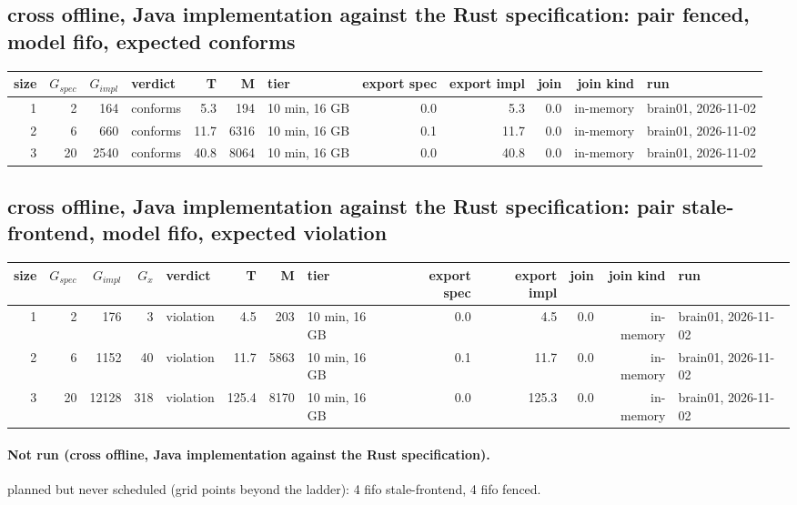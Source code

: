 \documentclass[10pt]{article}
\begin{document}
\subsection*{cross offline, Java implementation against the Rust specification: pair \textsf{fenced}, model fifo, expected conforms}
\begin{longtable}{@{}rrrlrrlrrrrl@{}}
\toprule
size & $G_{\mathit{spec}}$ & $G_{\mathit{impl}}$ & verdict & T & M & tier & export spec & export impl & join & join kind & run \\
\midrule
\endhead
\color{red} 1 & 2 & 164 & conforms & 5.3 & 194 & 10 min, 16 GB & 0.0 & 5.3 & 0.0 & in-memory & brain01, 2026-11-02 \\
\color{red} 2 & 6 & 660 & conforms & 11.7 & 6316 & 10 min, 16 GB & 0.1 & 11.7 & 0.0 & in-memory & brain01, 2026-11-02 \\
\color{red} 3 & 20 & 2540 & conforms & 40.8 & 8064 & 10 min, 16 GB & 0.0 & 40.8 & 0.0 & in-memory & brain01, 2026-11-02 \\
\bottomrule
\end{longtable}
\subsection*{cross offline, Java implementation against the Rust specification: pair \textsf{stale-frontend}, model fifo, expected violation}
\begin{longtable}{@{}rrrrlrrlrrrrl@{}}
\toprule
size & $G_{\mathit{spec}}$ & $G_{\mathit{impl}}$ & $G_x$ & verdict & T & M & tier & export spec & export impl & join & join kind & run \\
\midrule
\endhead
\color{red} 1 & 2 & 176 & 3 & violation & 4.5 & 203 & 10 min, 16 GB & 0.0 & 4.5 & 0.0 & in-memory & brain01, 2026-11-02 \\
\color{red} 2 & 6 & 1152 & 40 & violation & 11.7 & 5863 & 10 min, 16 GB & 0.1 & 11.7 & 0.0 & in-memory & brain01, 2026-11-02 \\
\color{red} 3 & 20 & 12128 & 318 & violation & 125.4 & 8170 & 10 min, 16 GB & 0.0 & 125.3 & 0.0 & in-memory & brain01, 2026-11-02 \\
\bottomrule
\end{longtable}
\paragraph{Not run (cross offline, Java implementation against the Rust specification).}
planned but never scheduled (grid points beyond the ladder): 4 fifo stale-frontend, 4 fifo fenced.\par
\end{document}

